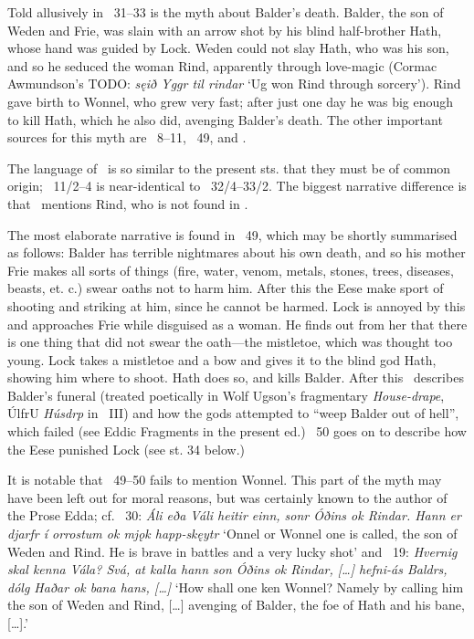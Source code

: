 \sectionline

{\small Told allusively in \Voluspa\ 31–33 is the myth about Balder’s death.  Balder, the son of Weden and Frie, was slain with an arrow shot by his blind half-brother Hath, whose hand was guided by Lock.  Weden could not slay Hath, who was his son, and so he seduced the woman Rind, apparently through love-magic (Cormac Awmundson’s TODO: \emph{sęið Yggr til rindar} ‘Ug won Rind through sorcery’).  Rind gave birth to Wonnel, who grew very fast; after just one day he was big enough to kill Hath, which he also did, avenging Balder’s death.  The other important sources for this myth are \Baldrsdraumar\ 8–11, \Gylfaginning\ 49, and \textcite[3.4.1–8]{Saxo}.

The language of \Baldrsdraumar\ is so similar to the present sts. that they must be of common origin; \Baldrsdraumar\ 11/2–4 is near-identical to \Voluspa\ 32/4–33/2.  The biggest narrative difference is that \Baldrsdraumar\ mentions Rind, who is not found in \Voluspa.

The most elaborate narrative is found in \Gylfaginning\ 49, which may be shortly summarised as follows: Balder has terrible nightmares about his own death, and so his mother Frie makes all sorts of things (fire, water, venom, metals, stones, trees, diseases, beasts, et. c.) swear oaths not to harm him.  After this the Eese make sport of shooting and striking at him, since he cannot be harmed.  Lock is annoyed by this and approaches Frie while disguised as a woman.  He finds out from her that there is one thing that did not swear the oath—the mistletoe, which was thought too young.  Lock takes a mistletoe and a bow and gives it to the blind god Hath, showing him where to shoot.  Hath does so, and kills Balder.  After this \Gylfaginning\ describes Balder’s funeral (treated poetically in Wolf Ugson’s fragmentary \emph{House-drape}, ÚlfrU \emph{Húsdrp} in \Skp\ III) and how the gods attempted to “weep Balder out of hell”, which failed (see Eddic Fragments in the present ed.)  \Gylfaginning\ 50 goes on to describe how the Eese punished Lock (see st. 34 below.)

It is notable that \Gylfaginning\ 49–50 fails to mention Wonnel.  This part of the myth may have been left out for moral reasons, but was certainly known to the author of the Prose Edda; cf. \Gylfaginning\ 30: \emph{Áli eða Váli heitir einn, sonr Óðins ok Rindar. Hann er djarfr í orrostum ok mjǫk happ-skęytr} ‘Onnel or Wonnel one is called, the son of Weden and Rind. He is brave in battles and a very lucky shot’ and \Skaldskaparmal\ 19: \emph{Hvernig skal kenna Vála? Svá, at kalla hann son Óðins ok Rindar, [\dots] hefni-ás Baldrs, dólg Haðar ok bana hans, [\dots]} ‘How shall one ken Wonnel? Namely by calling him the son of Weden and Rind, [\dots] avenging  of Balder, the foe of Hath and his bane, [\dots].’

}

